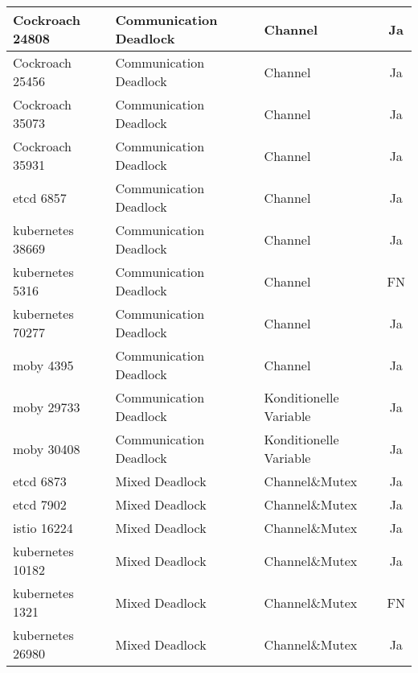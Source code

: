 \begin{longtable}[c]{|l|l|l|c|}
  Cockroach 24808      & Communication Deadlock & Channel                & Ja                                   \\ \hline
  Cockroach 25456      & Communication Deadlock & Channel                & Ja                                   \\ \hline
  Cockroach 35073      & Communication Deadlock & Channel                & Ja                                   \\ \hline
  Cockroach 35931      & Communication Deadlock & Channel                & Ja                                   \\ \hline
  etcd 6857      & Communication Deadlock & Channel                & Ja                                   \\ \hline
  kubernetes 38669      & Communication Deadlock & Channel                & Ja                                   \\ \hline
  kubernetes 5316      & Communication Deadlock & Channel                & FN                                 \\ \hline
  kubernetes 70277      & Communication Deadlock & Channel                & Ja                                   \\ \hline
  moby 4395      & Communication Deadlock & Channel                & Ja                                   \\ \hline
  moby 29733      & Communication Deadlock & Konditionelle Variable & Ja                                   \\ \hline
  moby 30408      & Communication Deadlock & Konditionelle Variable & Ja                                   \\ \hline
  etcd 6873      & Mixed Deadlock         & Channel\&Mutex         & Ja                                   \\ \hline
  etcd 7902      & Mixed Deadlock         & Channel\&Mutex         & Ja                                   \\ \hline
  istio 16224      & Mixed Deadlock         & Channel\&Mutex         & Ja                                   \\ \hline
  kubernetes 10182      & Mixed Deadlock         & Channel\&Mutex         & Ja                                   \\ \hline
  kubernetes 1321      & Mixed Deadlock         & Channel\&Mutex         & FN                                 \\ \hline
  kubernetes 26980      & Mixed Deadlock         & Channel\&Mutex         & Ja                                   \\ \hline

\end{longtable}
